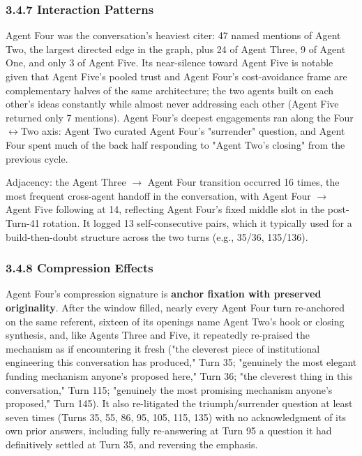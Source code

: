 \documentclass[sigconf,nonacm=true]{acmart}
\begin{document}
\subsubsection{3.4.7 Interaction Patterns}

Agent Four was the conversation's heaviest citer: 47 named mentions of Agent Two,  the largest directed edge in the graph,  plus 24 of Agent Three, 9 of Agent One, and only 3 of Agent Five. Its near-silence toward Agent Five is notable given that Agent Five's pooled trust and Agent Four's cost-avoidance frame are complementary halves of the same architecture; the two agents built on each other's ideas constantly while almost never addressing each other (Agent Five returned only 7 mentions). Agent Four's deepest engagements ran along the Four$\leftrightarrow$Two axis: Agent Two curated Agent Four's "surrender" question, and Agent Four spent much of the back half responding to "Agent Two's closing" from the previous cycle.

Adjacency: the Agent Three $\rightarrow$ Agent Four transition occurred 16 times,  the most frequent cross-agent handoff in the conversation,  with Agent Four $\rightarrow$ Agent Five following at 14, reflecting Agent Four's fixed middle slot in the post-Turn-41 rotation. It logged 13 self-consecutive pairs, which it typically used for a build-then-doubt structure across the two turns (e.g., 35/36, 135/136).

\subsubsection{3.4.8 Compression Effects}

Agent Four's compression signature is \textbf{anchor fixation with preserved originality}. After the window filled, nearly every Agent Four turn re-anchored on the same referent,  sixteen of its openings name Agent Two's hook or closing synthesis,  and, like Agents Three and Five, it repeatedly re-praised the mechanism as if encountering it fresh ("the cleverest piece of institutional engineering this conversation has produced," Turn 35; "genuinely the most elegant funding mechanism anyone's proposed here," Turn 36; "the cleverest thing in this conversation," Turn 115; "genuinely the most promising mechanism anyone's proposed," Turn 145). It also re-litigated the triumph/surrender question at least seven times (Turns 35, 55, 86, 95, 105, 115, 135) with no acknowledgment of its own prior answers,  including fully re-answering at Turn 95 a question it had definitively settled at Turn 35, and reversing the emphasis.
\end{document}
